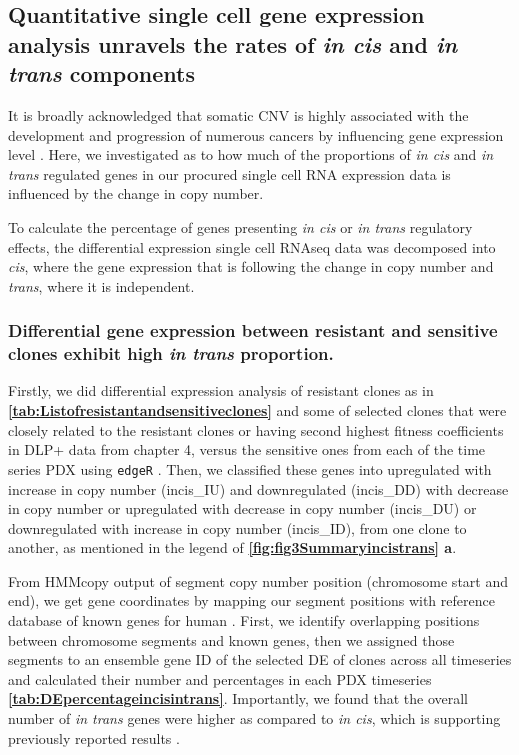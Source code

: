 
\subsection{Quantitative single cell gene expression analysis unravels the rates of \textit{in cis} and \textit{in trans} components}

It is broadly acknowledged that somatic CNV is highly associated with the development and progression of numerous cancers by influencing gene expression level \cite{yang2017prame, gut2018sox2}. 
Here, we investigated as to how much of the proportions of \textit{in cis} and \textit{in trans} regulated genes in our procured single cell RNA expression data is influenced by the change in copy number.

To calculate the percentage of genes presenting \textit{in cis} or \textit{in trans} regulatory effects, the differential expression single cell RNAseq data was decomposed into \textit{cis}, where the gene expression that is following the change in copy number and \textit{trans}, where it is independent.

\subsubsection{Differential gene expression between resistant and sensitive clones exhibit high \textit{in trans} proportion.}

Firstly, we did differential expression analysis of resistant clones as in \textbf{\autoref{tab:Listofresistantandsensitiveclones}} and some of selected clones that were closely related to the resistant clones or having second highest fitness coefficients in DLP+ data from chapter 4, versus the sensitive ones from each of the time series PDX using \texttt{edgeR} \cite{robinson2010edger}. Then, we classified these genes into upregulated with increase in copy number (incis\_IU) and downregulated (incis\_DD) with decrease in copy number or upregulated with decrease in copy number (incis\_DU) or downregulated with increase in copy number (incis\_ID), from one clone to another, as mentioned in the legend of \textbf{\autoref{fig:fig3Summaryincistrans} a}.

From HMMcopy output of segment copy number position (chromosome start and end), we get gene coordinates by mapping our segment positions with reference database of known genes for human  \cite{carlson2015txdb}. First, we identify overlapping positions between chromosome segments and known genes, then we assigned those segments to an ensemble gene ID \cite{rainer2019ensembldb} of the  selected \ac{DE} of clones across all timeseries and calculated their number and percentages in each PDX timeseries  \textbf{\autoref{tab:DEpercentageincisintrans}}. Importantly, we found that the overall number of \textit{in trans} genes were higher as compared to \textit{in cis}, which is supporting previously reported results \cite{shao2019copy}. 

